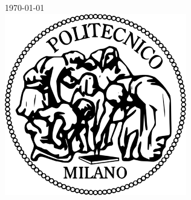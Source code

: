 \documentclass[12pt]{article}
\theoremstyle{definition}
\begin{document}
\begin{titlepage}


{\large \today}\\[2cm] %


\includegraphics[scale=0.4]{Logo_Politecnico_Milano.png}\\[1cm] %
 

\newpage

\end{titlepage}

\tableofcontents

\newpage




\end{document}
